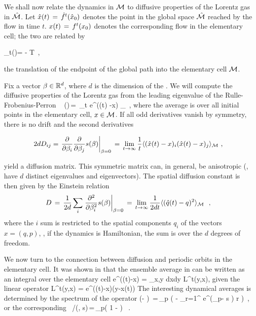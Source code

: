 \documentclass[aps,pre,
                showpacs,
                twocolumn,
                groupedaddress,
                floatfix]{revtex4-1}
\begin{document}
We shall now relate the dynamics in ${\cal M}$ to diffusive properties of the Lorentz
gas in $\hat {{\cal M}}$. Let $\hat x(t)\,=\,{\hat{f}^{t}(\hat x_0)}$ denotes the point in the global
space $\hat {{\cal M}}$ reached by the flow in time $t$. $x(t)\,=\,{f^{t}({x_0})}$ denotes
the corresponding flow in the elementary cell; the two are related by

\beq
\hn_t(\xInit)= -  \in T \,,

the translation of the endpoint of the global path into the elementary
cell $\pS$.

Fix a vector $\beta \in \reals^d$, where $d$ is the dimension of the
{\statesp}. We will compute the diffusive properties of the Lorentz
gas from the leading eigenvalue of the Rulle-Frobenius-Perron \evOper\
\beq
\eigenvL(\beta)\,=\, \lim_{t \rightarrow \infty}  \log \langle
e^{\beta \cdot (\hx(t) -x) } \rangle_\pS ~, \quad
\label{eq-diff-1}
\eeq
where the average is over all initial points in the elementary cell, $x \in
{\cal M}$. If all odd derivatives vanish by symmetry, there is no drift and the
second derivatives
\begin{widetext}
\[
2d D_{ij} = \left . {\frac{\partial}{\partial \beta_i}} {\frac{\partial} 
{\partial \beta_j}} s(\beta)\right\vert_{\beta=0} \,=\,\lim_{t\rightarrow
\infty} {\frac{1}{t}} \langle {(\hat x(t) -x)_i (\hat x(t) -x)_j } \rangle_{{\cal M}} ~,
\]
\end{widetext}
yield a diffusion matrix.  This symmetric matrix can, in general, be anisotropic
(\ie, have $d$ distinct eigenvalues and eigen\-vectors). The spatial diffusion
constant is then given by the Einstein relation
\[
D\,=\,{1\over 2 d} \sum_i \left .{{\partial}^2 \over {\partial
      \beta^2_i}} s(\beta)\right |_{\beta=0} \,=\,
\lim_{t\rightarrow \infty} {1\over{2d t}} \langle {(\hat{q}(t) -q)^2 }
\rangle_{{\cal M}}~ ~,
\]
where the $i$ sum is restricted to the spatial components $q_i$ of the
{\statesp} vectors $x=(q,p)$, \ie, if the dynamics is Hamiltonian, the sum is
over the $d$ degrees of freedom.


We now turn to the connection between diffusion and periodic orbits in
the elementary cell. It was shown in \refref{CGS92} that the ensemble average in
\refeq{eq-diff-1} can be written as an integral over the elementary cell
\beq
\langle e^{\beta\cdot(\hx(t)-x)} \rangle
   = \int_{x,y\in \pS} dxdy {\cal L}^t(y,x),
\eeq
given the linear \evOper operator
\beq
{\cal L}^t(y,x) = e^{\beta\cdot(\hx(t)-x)}\delta(y-x(t))
\label{eq-eOper}
\eeq
The interesting dynamical averages is determined by the spectrum of the operator
\beq \det(\eigenvL - \Lop) \,=\,\prod_{p} \exp \left(
  - { \sum_{r=1}^ { e^{(\beta \cdot \hn_p- s
        ) r} \over {} }
  } \right) \,,
or the corresponding \dzeta\
/\zeta(\beta, s)\,=\,\prod_{p}\left( 1 -  \right) ~.
\label{zeta-diff}
\eeq
\end{document}
